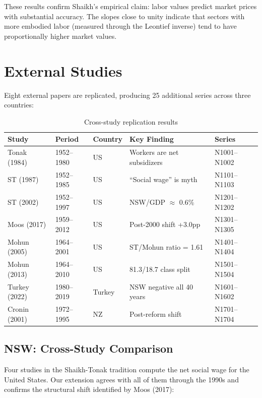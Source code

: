 \documentclass[12pt,a4paper]{article}
\begin{document}
These results confirm Shaikh's empirical claim: labor values predict market prices with substantial accuracy. The slopes close to unity indicate that sectors with more embodied labor (measured through the Leontief inverse) tend to have proportionally higher market values.

\section{External Studies}

Eight external papers are replicated, producing 25 additional series across three countries:

\begin{table}[H]
\centering
\caption{Cross-study replication results}
\begin{tabular}{lllll}
\toprule
Study & Period & Country & Key Finding & Series \\
\midrule
Tonak (1984) & 1952--1980 & US & Workers are net subsidizers & N1001--N1002 \\
ST (1987) & 1952--1985 & US & ``Social wage'' is myth & N1101--N1103 \\
ST (2002) & 1952--1997 & US & NSW/GDP $\approx$ 0.6\% & N1201--N1202 \\
Moos (2017) & 1959--2012 & US & Post-2000 shift +3.0pp & N1301--N1305 \\
Mohun (2005) & 1964--2001 & US & ST/Mohun ratio = 1.61 & N1401--N1404 \\
Mohun (2013) & 1964--2010 & US & 81.3/18.7 class split & N1501--N1504 \\
Turkey (2022) & 1980--2019 & Turkey & NSW negative all 40 years & N1601--N1602 \\
Cronin (2001) & 1972--1995 & NZ & Post-reform shift & N1701--N1704 \\
\bottomrule
\end{tabular}
\end{table}

\subsection{NSW: Cross-Study Comparison}

Four studies in the Shaikh-Tonak tradition compute the net social wage for the United States. Our extension agrees with all of them through the 1990s and confirms the structural shift identified by Moos (2017):
\end{document}
